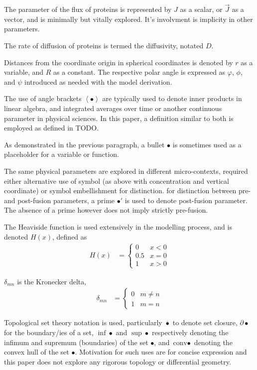 \documentclass{report}
\newcommand\Angle[1]{{ \left\langle{#1}\right\rangle }}
\newcommand\conv{{ \text{conv} }}
\begin{document}
The parameter of the flux of proteins is represented by $J$ as a scalar, or $\vec{J}$ as a vector, and is minimally but vitally explored. It's involvment is implicity in other parameters.

The rate of diffusion of proteins is termed the diffusivity, notated $D$.

Distances from the coordinate origin in spherical coordinates is denoted by $r$ as a variable, and $R$ as a constant. The respective polar angle is expressed as $\varphi$, $\phi$, and $\psi$ introduced as needed with the model derivation.

The use of angle brackets $\Angle{\bullet}$ are typically used to denote inner products in linear algebra, and integrated averages over time or another continuous parameter in physical sciences. In this paper, a definition similar to both is employed as defined in TODO.

As demonstrated in the previous paragraph, a bullet $\bullet$ is sometimes used as a placeholder for a variable or function.

The same physical parameters are explored in different micro-contexts, required either alternative use of symbol (as above with concentration and vertical coordinate) or symbol embellishment for distinction. for distinction between pre- and post-fusion parameters, a prime $\bullet'$ is used to denote post-fusion parameter. The absence of a prime however does not imply strictly pre-fusion.

The Heaviside function is used extensively in the modelling process, and is denoted $H(x)$, defined as
\begin{align*}
	H(x) &= \begin{cases}
		0 & x < 0 \\
		0.5 & x = 0 \\
		1 & x > 0
	\end{cases}
\end{align*}

$\delta_{mn}$ is the Kronecker delta,
\begin{align*}
	\delta_{mn} &= \begin{cases}
		0 & m \neq n \\
		1 & m = n
	\end{cases}
\end{align*}

Topological set theory notation is used, particularly $\overline\bullet$ to denote set closure, $\partial\bullet$ for the boundary/ies of a set, $\inf\bullet$ and $\sup\bullet$ respectively denoting the infimum and supremum (boundaries) of the set $\bullet$, and $\conv\bullet$ denoting the convex hull of the set $\bullet$. Motivation for such uses are for concise expression and this paper does not explore any rigorous topology or differential geometry.
\end{document}
